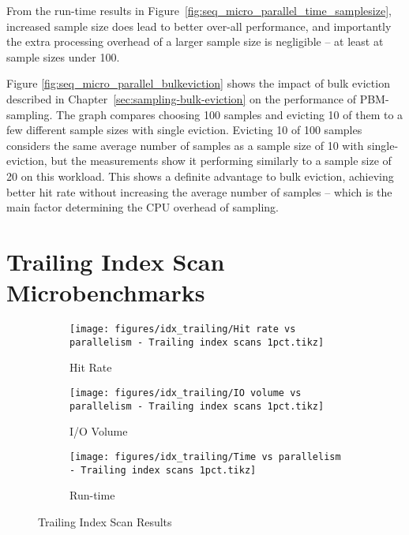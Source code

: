 From the run-time results in Figure~\ref{fig:seq_micro_parallel_time_samplesize}, increased sample size does lead to better over-all performance, and importantly the extra processing overhead of a larger sample size is negligible -- at least at sample sizes under 100.

Figure \ref{fig:seq_micro_parallel_bulkeviction} shows the impact of bulk eviction described in Chapter~\ref{sec:sampling-bulk-eviction} on the performance of PBM-sampling. The graph compares choosing 100 samples and evicting 10 of them to a few different sample sizes with single eviction. Evicting 10 of 100 samples considers the same average number of samples as a sample size of 10 with single-eviction, but the measurements show it performing similarly to a sample size of 20 on this workload. This shows a definite advantage to bulk eviction, achieving better hit rate without increasing the average number of samples -- which is the main factor determining the CPU overhead of sampling.



\section{Trailing Index Scan Microbenchmarks}

\begin{figure}
\centering
    \begin{subfigure}{0.45\textwidth}
        \centering
        \texttt{[image: figures/idx\_trailing/Hit rate vs parallelism - Trailing index scans 1pct.tikz]}
        \caption{Hit Rate}
        \label{fig:idx_trailing_hitrate}
    \end{subfigure}\hspace{0.05\textwidth}%
    \begin{subfigure}{0.45\textwidth}
        \centering
        \texttt{[image: figures/idx\_trailing/IO volume vs parallelism - Trailing index scans 1pct.tikz]}
        \caption{I/O Volume}
        \label{fig:idx_trailing_iovol}
    \end{subfigure}
    
\vspace{20pt}
    \begin{subfigure}{0.45\textwidth}
        \centering
        \texttt{[image: figures/idx\_trailing/Time vs parallelism - Trailing index scans 1pct.tikz]}
        \caption{Run-time}
        \label{fig:idx_trailing_runtime}
    \end{subfigure}
    \caption{Trailing Index Scan Results}
    \label{fig:idx_trailing}
\end{figure}



